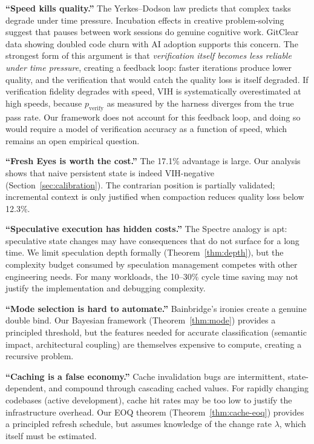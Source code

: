\documentclass[11pt,a4paper]{article}
\theoremstyle{definition}
\theoremstyle{remark}
\begin{document}
\textbf{``Speed kills quality.''} The Yerkes--Dodson law \citep{yerkes1908relation} predicts that complex tasks degrade under time pressure. Incubation effects in creative problem-solving \citep{sio2009incubation, wallas1926art} suggest that pauses between work sessions do genuine cognitive work. GitClear data showing doubled code churn with AI adoption \citep{gitclear2025} supports this concern. The strongest form of this argument is that \emph{verification itself becomes less reliable under time pressure}, creating a feedback loop: faster iterations produce lower quality, and the verification that would catch the quality loss is itself degraded. If verification fidelity degrades with speed, VIH is systematically overestimated at high speeds, because $p_{\mathrm{verify}}$ as measured by the harness diverges from the true pass rate. Our framework does not account for this feedback loop, and doing so would require a model of verification accuracy as a function of speed, which remains an open empirical question.

\textbf{``Fresh Eyes is worth the cost.''} The 17.1\% advantage is large. Our analysis shows that naive persistent state is indeed VIH-negative (Section~\ref{sec:calibration}). The contrarian position is partially validated; incremental context is only justified when compaction reduces quality loss below 12.3\%.

\textbf{``Speculative execution has hidden costs.''} The Spectre analogy \citep{spectre2018} is apt: speculative state changes may have consequences that do not surface for a long time. We limit speculation depth formally (Theorem~\ref{thm:depth}), but the complexity budget consumed by speculation management competes with other engineering needs. For many workloads, the 10--30\% cycle time saving may not justify the implementation and debugging complexity.

\textbf{``Mode selection is hard to automate.''} Bainbridge's ironies \citep{bainbridge1983ironies} create a genuine double bind. Our Bayesian framework (Theorem~\ref{thm:mode}) provides a principled threshold, but the features needed for accurate classification (semantic impact, architectural coupling) are themselves expensive to compute, creating a recursive problem.

\textbf{``Caching is a false economy.''} Cache invalidation bugs are intermittent, state-dependent, and compound through cascading cached values. For rapidly changing codebases (active development), cache hit rates may be too low to justify the infrastructure overhead. Our EOQ theorem (Theorem~\ref{thm:cache-eoq}) provides a principled refresh schedule, but assumes knowledge of the change rate $\lambda$, which itself must be estimated.
\end{document}
